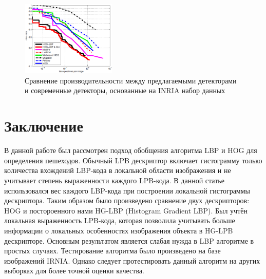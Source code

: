 \documentclass[12pt,twoside]{article}
\begin{document}

\begin{figure}[H]
	\includegraphics[width=0.4\textwidth]{Wang2}
	\caption{Сравнение производительности между предлагаемыми детекторами и современные детекторы, основанные на INRIA набор данных\cite{Wang09}}
	\label{fg:HOG_Wang}
\end{figure}

\section{Заключение}
В данной работе был рассмотрен подход обобщения алгоритма LBP и HOG для определения пешеходов. Обычный LPB дескриптор включает гистограмму только количества вхождений LBP-кода в локальной области изображения и не учитывает степень выраженности каждого LPB-кода. В данной статье использовался вес каждого LBP-кода при построении локальной гистограммы дескриптора. Таким образом было произведено сравнение двух дескрипторов: HOG и постороенного нами HG-LBP (Histogram Gradient LBP). Был учтён локальная выраженность LPB-кода, которая позволила учитывать больше информации о локальных особенностях изображения объекта в HG-LPB дескрипторе. Основным результатом является слабая нужда в LBP алгоритме в простых случаях. Тестирование алгоритма было произведено на базе изображений IRNIA. Однако следует протестировать данный алгоритм на других выборках для более точной оценки качества.


\bigskip
\maketitleSecondary




\end{document}
